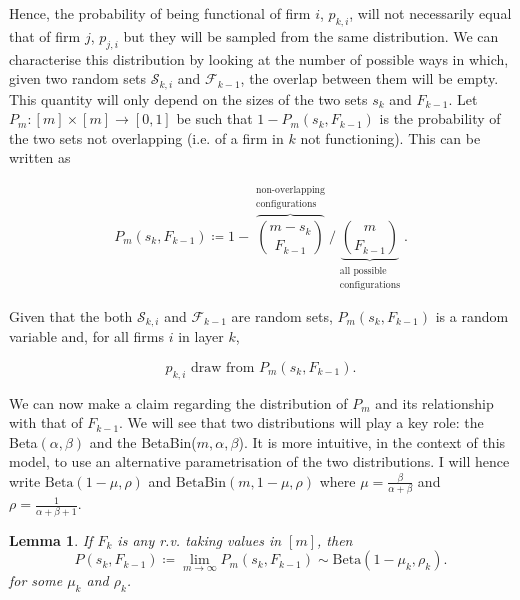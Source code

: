 \documentclass[draft, american, abstract=on]{scrartcl}
\theoremstyle{plain}
\newtheorem{lemma}{Lemma}
\newcommand{\Beta}{\text{Beta}}
\newcommand{\Bin}{\text{Bin}}
\begin{document}
Hence, the probability of being functional of firm $i$, $p_{k, i}$, will not necessarily equal that of firm $j$, $p_{j, i}$ but they will be sampled from the same distribution. We can characterise this distribution by looking at the number of possible ways in which, given two random sets $\mathcal{S}_{k, i}$ and $\mathcal{F}_{k - 1}$, the overlap between them will be empty. This quantity will only depend on the sizes of the two sets $s_k$ and $F_{k-1}$. Let $P_m: [m]\times[m]\to[0, 1]$ be such that $1 - P_m(s_k, F_{k - 1})$ is the probability of the two sets not overlapping (i.e. of a firm in $k$ not functioning). This can be written as 

\begin{equation}
  P_m(s_k, F_{k-1}) \coloneqq 1 - \overbrace{\binom{m - s_k}{F_{k-1}}}^{\substack{\text{non-overlapping} \\ \text{configurations}}} \Bigg/ \underbrace{\binom{m}{F_{k-1}}}_{\substack{\text{all possible} \\ \text{configurations}}}.
\end{equation}

Given that the both $\mathcal{S}_{k, i}$ and $\mathcal{F}_{k - 1}$ are random sets, $P_m(s_k, F_{k-1})$ is a random variable and, for all firms $i$ in layer $k$,

\begin{equation}
  p_{k, i} \text{ draw from } P_m(s_k, F_{k-1}).
\end{equation}

We can now make a claim regarding the distribution of $P_m$ and its relationship with that of $F_{k - 1}$. We will see that two distributions will play a key role: the Beta$(\alpha, \beta)$ and the BetaBin($m, \alpha, \beta$). It is more intuitive, in the context of this model, to use an alternative parametrisation of the two distributions. I will hence write $\Beta(1 - \mu, \rho)$ and $\Beta\Bin(m, 1 - \mu, \rho)$ where $\mu = \frac{\beta}{\alpha + \beta}$ and $\rho = \frac{1}{\alpha + \beta + 1}$.

\begin{lemma} \label{lemma:Ftop}
  If $F_k$ is any r.v. taking values in $[m]$, then \begin{equation*}P(s_k, F_{k - 1}) \coloneqq \lim_{m \rightarrow \infty} P_m(s_k, F_{k - 1}) \sim \Beta(1 - \mu_k, \rho_k).\end{equation*} for some $\mu_k$ and $\rho_k$.
\end{lemma}
\end{document}
